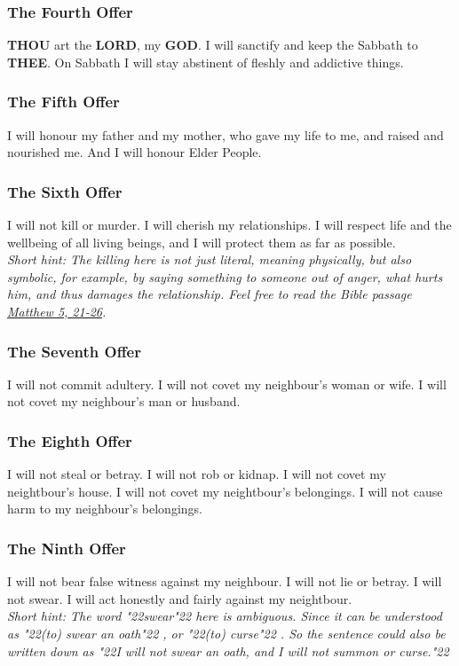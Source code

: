 \documentclass[12pt,a5paper]{article}
\newcommand{\God}[0]{\textbf{GOD}}
\newcommand{\Lord}[0]{\textbf{LORD}}
\newcommand{\Thee}[0]{\textbf{THEE}}
\newcommand{\Thou}[0]{\textbf{THOU}}
\newcommand{\q}[1]{\char"22{#1}\char"22 }
\begin{document}
	\subsubsection{The Fourth Offer}
		{\Thou} art the {\Lord},
		my {\God}.
		I will sanctify and keep the Sabbath to {\Thee}.
		On Sabbath I will stay abstinent of fleshly
		and addictive things.
		
	\subsubsection{The Fifth Offer}
		I will honour my father and my mother,
		who gave my life to me,
		and raised and nourished me.
		And I will honour Elder People.
			
	\subsubsection{The Sixth Offer} \label{TheSixthOffer}
		I will not kill or murder.
		I will cherish my relationships.
		I will respect life and the wellbeing of all living beings,
		and I will protect them as far as possible.
		\\
		\textit{Short hint:
		The killing here is not just literal,
		meaning physically,
		but also symbolic,
		for example,
		by saying something to someone out of anger,
		what hurts him,
		and thus damages the relationship.
		Feel free to read the Bible passage \href{https://www.die-bibel.de/bibeln/online-bibeln/lesen/ESV/MAT.5/Matthew-5}{Matthew 5, 21-26}.}
		
	\subsubsection{The Seventh Offer}
		I will not commit adultery.
		I will not covet my neighbour's woman or wife.
		I will not covet my neighbour's man or husband.
		
	\subsubsection{The Eighth Offer}
		I will not steal or betray.
		I will not rob or kidnap.
		I will not covet my neightbour's house.
		I will not covet my neightbour's belongings.
		I will not cause harm to my neighbour's belongings.
		
	\subsubsection{The Ninth Offer} \label{TheNinthOffer}
		I will not bear false witness against my neighbour.
		I will not lie or betray.
		I will not swear.
		I will act honestly and fairly against my neightbour.
		\\
		\textit{Short hint:
		The word \q{swear} here is ambiguous.
		Since it can be understood as \q{(to) swear an oath},
		or \q{(to) curse}.
		So the sentence could also be written down as
		\q{I will not swear an oath, and I will not summon or curse.}}
		
\end{document}

